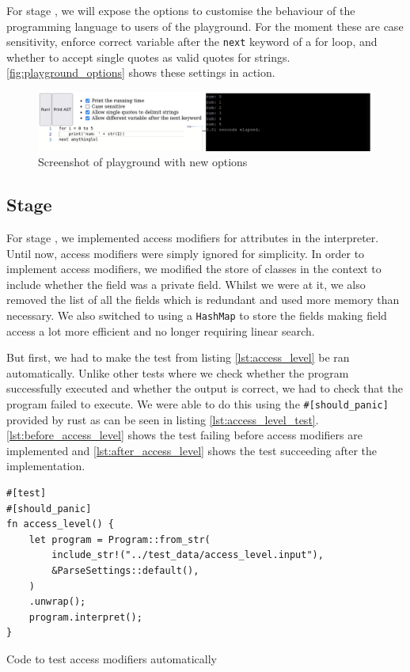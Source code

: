 \documentclass{article}
\newcommand{\subsecnum}{\the\value{subsection}}
\begin{document}
For stage \subsecnum, we will expose the options to customise the behaviour of
the programming language to users of the playground. For the moment these are
case sensitivity, enforce correct variable after the \texttt{next} keyword of a
for loop, and whether to accept single quotes as valid quotes for strings.
\autoref{fig:playground_options} shows these settings in action.

\begin{figure}
	\includegraphics[width=\textwidth]{playground_options}
	\caption{Screenshot of playground with new options}
	\label{fig:playground_options}
\end{figure}

\subsection{Stage \subsecnum}

For stage \subsecnum, we implemented access modifiers for attributes in the
interpreter. Until now, access modifiers were simply ignored for simplicity.
In order to implement access modifiers, we modified the store of classes in the
context to include whether the field was a private field. Whilst we were at it,
we also removed the list of all the fields which is redundant and used more
memory than necessary. We also switched to using a \texttt{HashMap} to store the
fields making field access a lot more efficient and no longer requiring linear
search.

But first, we had to make the test from listing \ref{lst:access_level} be ran
automatically. Unlike other tests where we check whether the program
successfully executed and whether the output is correct, we had to check that
the program failed to execute. We were able to do this using the
\texttt{#[should_panic]} provided by rust as can be seen in listing
\ref{lst:access_level_test}. \autoref{lst:before_access_level} shows the test
failing before access modifiers are implemented and
\autoref{lst:after_access_level} shows the test succeeding after the
implementation.

\begin{listing}
	\begin{verbatim}
#[test]
#[should_panic]
fn access_level() {
    let program = Program::from_str(
        include_str!("../test_data/access_level.input"),
        &ParseSettings::default(),
    )
    .unwrap();
    program.interpret();
}
	\end{verbatim}
	\caption{Code to test access modifiers automatically}
	\label{lst:access_level_test}
\end{listing}
\end{document}
